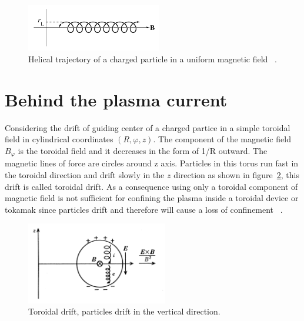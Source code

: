 \begin{figure}
	\centering
	\includegraphics[width=0.525\textwidth]{Chp1/Helical_tray.png}
	\caption{  Helical trajectory of a charged particle in a uniform magnetic field ~\cite[Chapter~8]{Freidberg2007}.\label{Helical}}
\end{figure}

\section{Behind the plasma current}

Considering the drift of guiding center of a charged partice in a simple toroidal field in cylindrical coordinates $(R,\varphi,z)$. The component of the magnetic field $B_\varphi$ is the toroidal field and it decreases in the form of 1/R outward. The magnetic lines of force are circles around z axis. Particles in this  torus run fast in the toroidal direction and drift slowly in the $z$ direction as shown in figure~\ref{TDrift}, this drift is called toroidal drift. As a consequence  using only a toroidal component of magnetic field is not sufficient for confining the plasma inside a toroidal device or  tokamak  since particles drift and therefore will cause a loss of confinement ~\cite[Chapter~3]{Miyamoto2011}.\smallskip


\begin{figure}
	\centering
	\includegraphics[width=0.55\textwidth]{Chp1/ToroidalDrift.png}
	\caption{Toroidal drift, particles drift in the vertical direction. ~\cite[Chapter~3]{Miyamoto2011} \label{TDrift}}
\end{figure}



